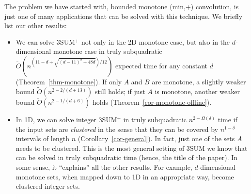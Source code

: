 \documentclass[11pt]{article}
\newcommand{\OO}{\widetilde{O}}
\begin{document}
The problem we have started with, bounded monotone (min,+) convolution, is just one of many applications that can
be solved with this technique.  We briefly list our
other results:
\begin{itemize}
\item
We can solve 3SUM$^+$ not only in the 2D monotone case, but
also in the $d$-dimensional monotone case
in truly subquadratic
$\OO(n^{(11-d+\sqrt{(d-11)^2+48d})/12})$ expected time
for any constant $d$ (Theorem~\ref{thm-monotone}).
If only $A$ and $B$ are monotone,
a slightly weaker bound $\OO(n^{2-2/(d+13)})$ still holds;
if just $A$ is monotone, another
weaker bound $\OO(n^{2-1/(d+6)})$ holds (Theorem~\ref{cor-monotone-offline}).
\item
In 1D,
we can solve integer 3SUM$^+$ in truly subquadratic
$n^{2-\Omega(\delta)}$ time
if the input sets are {\em clustered} in the sense that
they can be covered by $n^{1-\delta}$
intervals of length $n$ (Corollary~\ref{cor-general}).
In fact, just one of the sets $A$ needs to be clustered.
This is the most general setting of 3SUM we know that
can be solved in truly subquadratic time
(hence, the title of the paper).
In some sense, it ``explains'' all the other results.
For example, $d$-dimensional
monotone sets, when mapped down to 1D in an appropriate way, become
clustered integer sets.


\end{itemize}
\end{document}
